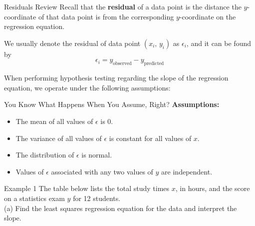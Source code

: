 \documentclass[t]{beamer}
\begin{document}
\begin{frame}{Residuals Review}
Recall that the {\color{blue}\textbf{residual}} of a data point is the distance the $y$-coordinate of that data point is from the corresponding $y$-coordinate on the regression equation. \newline\\	\pause

We usually denote the residual of data point $(x_i, \, y_i)$ as $\epsilon_i$, and it can be found by 
\[
\epsilon_i = y_{\text{observed}} - y_{\text{predicted}}
\]
\pause

When performing hypothesis testing regarding the slope of the regression equation, we operate under the following assumptions:
\end{frame}

\begin{frame}{You Know What Happens When You Assume, Right?}
\textbf{Assumptions:}
\begin{itemize}
	\item<2-> The mean of all values of $\epsilon$ is 0.
	\item<3-> The variance of all values of $\epsilon$ is constant for all values of $x$.
	\item<4-> The distribution of $\epsilon$ is normal.
	\item<5-> Values of $\epsilon$ associated with any two values of $y$ are independent.
\end{itemize}
\end{frame}

\begin{frame}{Example 1}
The table below lists the total study times $x$, in hours, and the score on a statistics exam $y$ for 12 students. \newline\\
(a) \quad Find the least squares regression equation for the data and interpret the slope.	\newline\\

\end{frame}
\end{document}
